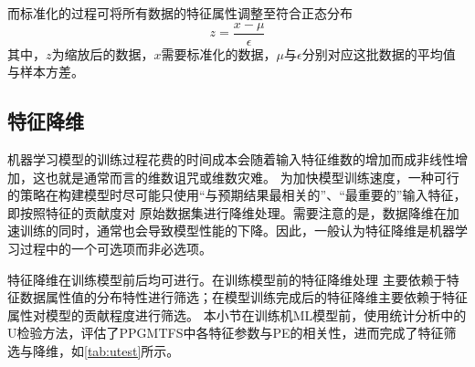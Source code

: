 而标准化的过程可将所有数据的特征属性调整至符合正态分布
\begin{equation}
  \label{equ:normalization}
  z = \frac{x - \mu}{\epsilon}
\end{equation}
其中，$z$为缩放后的数据，$x$需要标准化的数据，$\mu$与$\epsilon$分别对应这批数据的平均值与样本方差。

\subsection{特征降维}
机器学习模型的训练过程花费的时间成本会随着输入特征维数的增加而成非线性增加，这也就是通常而言的维数诅咒或维数灾难。
为加快模型训练速度，一种可行的策略在构建模型时尽可能只使用“与预期结果最相关的”、“最重要的”输入特征，即按照特征的贡献度对
原始数据集进行降维处理。需要注意的是，数据降维在加速训练的同时，通常也会导致模型性能的下降。因此，一般认为特征降维是机器学习过程中的一个可选项而非必选项。

特征降维在训练模型前后均可进行。在训练模型前的特征降维处理
主要依赖于特征数据属性值的分布特性进行筛选；在模型训练完成后的特征降维主要依赖于特征属性对模型的贡献程度进行筛选。
本小节在训练机ML模型前，使用统计分析中的U检验方法，评估了PPGMTFS中各特征参数与PE的相关性，进而完成了特征筛选与降维，如\autoref{tab:utest}所示。

